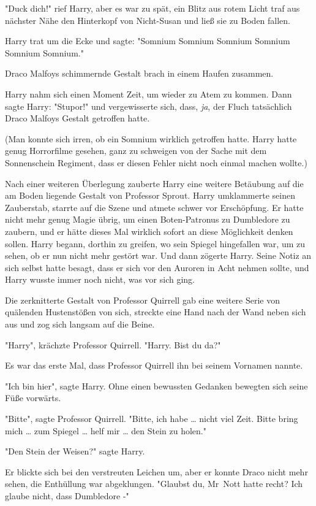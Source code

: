{"Duck dich!" rief Harry, aber es war zu spät, ein Blitz aus rotem Licht traf aus nächster Nähe den Hinterkopf von Nicht-Susan und ließ sie zu Boden fallen.

Harry trat um die Ecke und sagte: "Somnium Somnium Somnium Somnium Somnium Somnium."

Draco Malfoys schimmernde Gestalt brach in einem Haufen zusammen.

Harry nahm sich einen Moment Zeit, um wieder zu Atem zu kommen. Dann sagte Harry: "Stupor!" und vergewisserte sich, dass, \emph{ja}, der Fluch tatsächlich Draco Malfoys Gestalt getroffen hatte.

(Man konnte sich irren, ob ein Somnium wirklich getroffen hatte. Harry hatte genug Horrorfilme gesehen, ganz zu schweigen von der Sache mit dem Sonnenschein Regiment, dass er diesen Fehler nicht noch einmal machen wollte.)

Nach einer weiteren Überlegung zauberte Harry eine weitere Betäubung auf die am Boden liegende Gestalt von Professor Sprout. Harry umklammerte seinen Zauberstab, starrte auf die Szene und atmete schwer vor Erschöpfung. Er hatte nicht mehr genug Magie übrig, um einen Boten-Patronus zu Dumbledore zu zaubern, und er hätte dieses Mal wirklich sofort an diese Möglichkeit denken sollen. Harry begann, dorthin zu greifen, wo sein Spiegel hingefallen war, um zu sehen, ob er nun nicht mehr gestört war. Und dann zögerte Harry. Seine Notiz an sich selbst hatte besagt, dass er sich vor den Auroren in Acht nehmen sollte, und Harry wusste immer noch nicht, was vor sich ging.

Die zerknitterte Gestalt von Professor Quirrell gab eine weitere Serie von quälenden Hustenstößen von sich, streckte eine Hand nach der Wand neben sich aus und zog sich langsam auf die Beine.

"Harry", krächzte Professor Quirrell. "Harry. Bist du da?"

Es war das erste Mal, dass Professor Quirrell ihn bei seinem Vornamen nannte.

"Ich bin hier", sagte Harry. Ohne einen bewussten Gedanken bewegten sich seine Füße vorwärts.

"Bitte", sagte Professor Quirrell. "Bitte, ich habe … nicht viel Zeit. Bitte bring mich … zum Spiegel … helf mir … den Stein zu holen."

"Den Stein der Weisen?" sagte Harry.

Er blickte sich bei den verstreuten Leichen um, aber er konnte Draco nicht mehr sehen, die Enthüllung war abgeklungen. "Glaubst du, Mr~Nott hatte recht? Ich glaube nicht, dass Dumbledore -"

}
